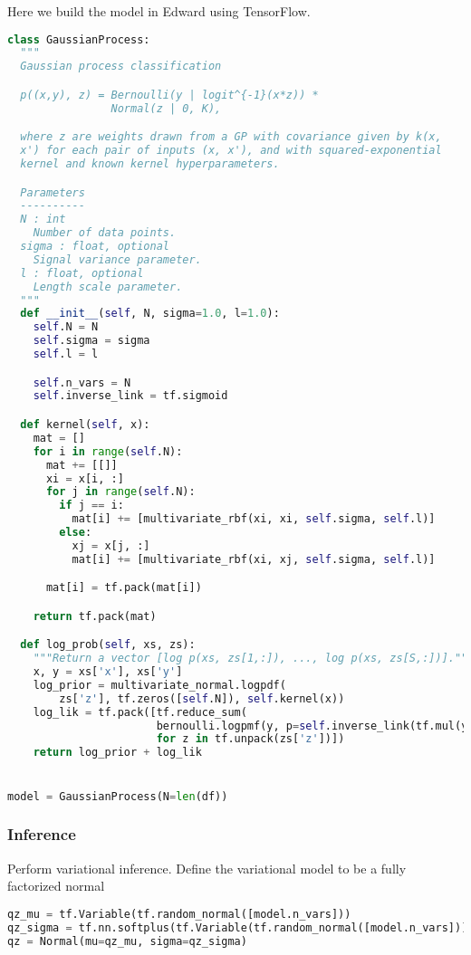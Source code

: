 Here we build the model in Edward using TensorFlow.
\begin{lstlisting}[language=Python]
class GaussianProcess:
  """
  Gaussian process classification

  p((x,y), z) = Bernoulli(y | logit^{-1}(x*z)) *
                Normal(z | 0, K),

  where z are weights drawn from a GP with covariance given by k(x,
  x') for each pair of inputs (x, x'), and with squared-exponential
  kernel and known kernel hyperparameters.

  Parameters
  ----------
  N : int
    Number of data points.
  sigma : float, optional
    Signal variance parameter.
  l : float, optional
    Length scale parameter.
  """
  def __init__(self, N, sigma=1.0, l=1.0):
    self.N = N
    self.sigma = sigma
    self.l = l

    self.n_vars = N
    self.inverse_link = tf.sigmoid

  def kernel(self, x):
    mat = []
    for i in range(self.N):
      mat += [[]]
      xi = x[i, :]
      for j in range(self.N):
        if j == i:
          mat[i] += [multivariate_rbf(xi, xi, self.sigma, self.l)]
        else:
          xj = x[j, :]
          mat[i] += [multivariate_rbf(xi, xj, self.sigma, self.l)]

      mat[i] = tf.pack(mat[i])

    return tf.pack(mat)

  def log_prob(self, xs, zs):
    """Return a vector [log p(xs, zs[1,:]), ..., log p(xs, zs[S,:])]."""
    x, y = xs['x'], xs['y']
    log_prior = multivariate_normal.logpdf(
        zs['z'], tf.zeros([self.N]), self.kernel(x))
    log_lik = tf.pack([tf.reduce_sum(
                       bernoulli.logpmf(y, p=self.inverse_link(tf.mul(y, z))))
                       for z in tf.unpack(zs['z'])])
    return log_prior + log_lik


model = GaussianProcess(N=len(df))
\end{lstlisting}


\subsubsection{Inference}

Perform variational inference.
Define the variational model to be a fully factorized normal
\begin{lstlisting}[language=Python]
qz_mu = tf.Variable(tf.random_normal([model.n_vars]))
qz_sigma = tf.nn.softplus(tf.Variable(tf.random_normal([model.n_vars])))
qz = Normal(mu=qz_mu, sigma=qz_sigma)
\end{lstlisting}

